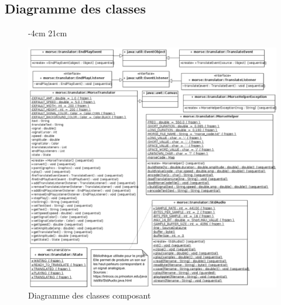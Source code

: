 \documentclass[a4paper,11pt]{article}
\begin{document}
    \subsection{Diagramme des classes}
    \begin{figure}[H]
         -4cm 21cm
        \begin{center}
            \includegraphics[scale=0.58]{classdiag.png}
            \caption{Diagramme des classes composant}
            \label{Diagramme des classes du composant}
        \end{center}
    \end{figure}
\end{document}
